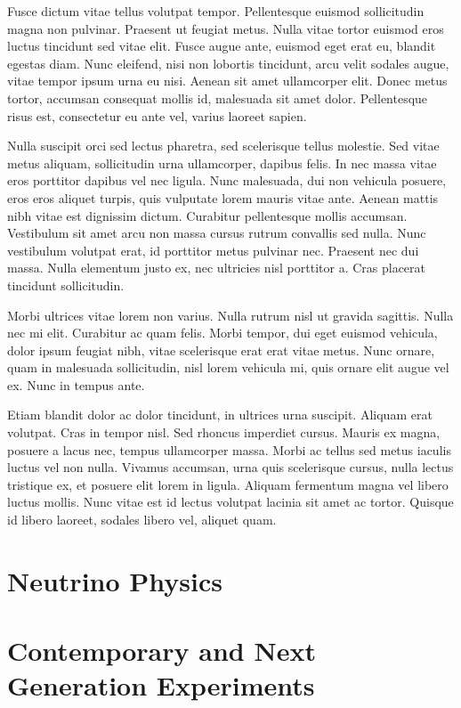 \documentclass[a4paper, 11pt]{report}
\begin{document}
Fusce dictum vitae tellus volutpat tempor. Pellentesque euismod sollicitudin magna non pulvinar. Praesent ut feugiat metus. Nulla vitae tortor euismod eros luctus tincidunt sed vitae elit. Fusce augue ante, euismod eget erat eu, blandit egestas diam. Nunc eleifend, nisi non lobortis tincidunt, arcu velit sodales augue, vitae tempor ipsum urna eu nisi. Aenean sit amet ullamcorper elit. Donec metus tortor, accumsan consequat mollis id, malesuada sit amet dolor. Pellentesque risus est, consectetur eu ante vel, varius laoreet sapien.

Nulla suscipit orci sed lectus pharetra, sed scelerisque tellus molestie. Sed vitae metus aliquam, sollicitudin urna ullamcorper, dapibus felis. In nec massa vitae eros porttitor dapibus vel nec ligula. Nunc malesuada, dui non vehicula posuere, eros eros aliquet turpis, quis vulputate lorem mauris vitae ante. Aenean mattis nibh vitae est dignissim dictum. Curabitur pellentesque mollis accumsan. Vestibulum sit amet arcu non massa cursus rutrum convallis sed nulla. Nunc vestibulum volutpat erat, id porttitor metus pulvinar nec. Praesent nec dui massa. Nulla elementum justo ex, nec ultricies nisl porttitor a. Cras placerat tincidunt sollicitudin.

Morbi ultrices vitae lorem non varius. Nulla rutrum nisl ut gravida sagittis. Nulla nec mi elit. Curabitur ac quam felis. Morbi tempor, dui eget euismod vehicula, dolor ipsum feugiat nibh, vitae scelerisque erat erat vitae metus. Nunc ornare, quam in malesuada sollicitudin, nisl lorem vehicula mi, quis ornare elit augue vel ex. Nunc in tempus ante.

Etiam blandit dolor ac dolor tincidunt, in ultrices urna suscipit. Aliquam erat volutpat. Cras in tempor nisl. Sed rhoncus imperdiet cursus. Mauris ex magna, posuere a lacus nec, tempus ullamcorper massa. Morbi ac tellus sed metus iaculis luctus vel non nulla. Vivamus accumsan, urna quis scelerisque cursus, nulla lectus tristique ex, et posuere elit lorem in ligula. Aliquam fermentum magna vel libero luctus mollis. Nunc vitae est id lectus volutpat lacinia sit amet ac tortor. Quisque id libero laoreet, sodales libero vel, aliquet quam.

\chapter{Neutrino Physics}


\chapter{Contemporary and Next Generation Experiments}
\end{document}
